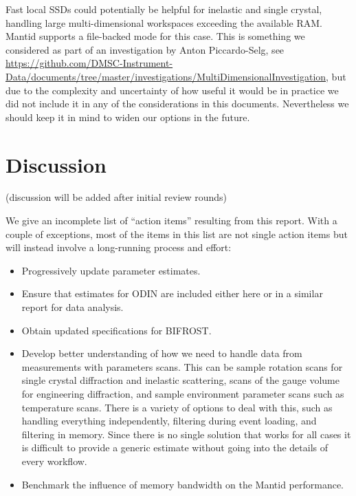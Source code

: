 \documentclass[a4paper,english,numbers=noenddot,bibliography=totoc,chapterprefix=on,DIV=12]{scrartcl}
\newcommand{\bifrost}{BIFROST\xspace}
\newcommand{\odin}{ODIN\xspace}
\newcommand{\mantid}{Mantid\xspace}
\begin{document}
Fast local SSDs could potentially be helpful for inelastic and single crystal, handling large multi-dimensional workspaces exceeding the available RAM.
\mantid supports a file-backed mode for this case.
This is something we considered as part of an investigation by Anton Piccardo-Selg, see \url{https://github.com/DMSC-Instrument-Data/documents/tree/master/investigations/MultiDimensionalInvestigation}, but due to the complexity and uncertainty of how useful it would be in practice we did not include it in any of the considerations in this documents.
Nevertheless we should keep it in mind to widen our options in the future.




\section{Discussion}

(discussion will be added after initial review rounds)

We give an incomplete list of ``action items'' resulting from this report.
With a couple of exceptions, most of the items in this list are not single action items but will instead involve a long-running process and effort:
\begin{itemize}
  \item Progressively update parameter estimates.
  \item Ensure that estimates for \odin are included either here or in a similar report for data analysis.
  \item Obtain updated specifications for \bifrost.
  \item Develop better understanding of how we need to handle data from measurements with parameters scans.
    This can be sample rotation scans for single crystal diffraction and inelastic scattering, scans of the gauge volume for engineering diffraction, and sample environment parameter scans such as temperature scans.
    There is a variety of options to deal with this, such as handling everything independently, filtering during event loading, and filtering in memory.
    Since there is no single solution that works for all cases it is difficult to provide a generic estimate without going into the details of every workflow.
  \item Benchmark the influence of memory bandwidth on the \mantid performance.
\end{itemize}




\appendix
\end{document}
